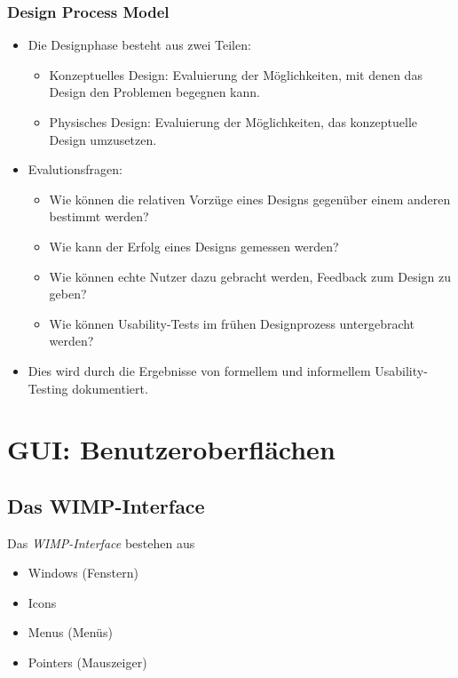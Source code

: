 				\subsubsection{Design Process Model}
					\begin{itemize}
						\item Die Designphase besteht aus zwei Teilen:
							\begin{itemize}
								\item Konzeptuelles Design: Evaluierung der Möglichkeiten, mit denen das Design den Problemen begegnen kann.
								\item Physisches Design: Evaluierung der Möglichkeiten, das konzeptuelle Design umzusetzen.
							\end{itemize}
						\item Evalutionsfragen:
							\begin{itemize}
								\item Wie können die relativen Vorzüge eines Designs gegenüber einem anderen bestimmt werden?
								\item Wie kann der Erfolg eines Designs gemessen werden?
								\item Wie können echte Nutzer dazu gebracht werden, Feedback zum Design zu geben?
								\item Wie können Usability-Tests im frühen Designprozess untergebracht werden?
							\end{itemize}
						\item Dies wird durch die Ergebnisse von formellem und informellem Usability-Testing dokumentiert.
					\end{itemize}

		\section{GUI: Benutzeroberflächen}
			\subsection{Das WIMP-Interface}
				Das \emph{WIMP-Interface} bestehen aus
				\begin{itemize}
					\item Windows (Fenstern)
					\item Icons
					\item Menus (Menüs)
					\item Pointers (Mauszeiger)
				\end{itemize}


